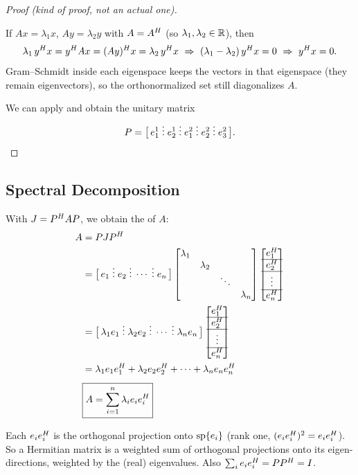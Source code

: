 \begin{proof}[Proof (kind of proof, not an actual one)]
\begin{insight}
If $Ax=\lambda_1x$, $Ay=\lambda_2y$ with $A=A^{H}$ (so $\lambda_1,\lambda_2\in\mathbb{R}$), then
\[
\lambda_1\, y^{H} x = y^{H} A x = (A y)^{H} x = \lambda_2\, y^{H} x
\ \Rightarrow\ (\lambda_1-\lambda_2)\,y^{H} x = 0
\ \Rightarrow\ y^{H} x = 0 .
\]
Gram--Schmidt inside each eigenspace keeps the vectors in that eigenspace (they remain eigenvectors), so the orthonormalized set still diagonalizes $A$.
\end{insight}
\point We can apply  and obtain the unitary matrix
\[
P = \bigl[\, e_1^1 \;\vdots\; e_2^1 \;\vdots\; e_1^2 \;\vdots\; e_2^2 \;\vdots\; e_3^2 \,\bigr].\qedhere
\]
\end{proof}

\subsection{Spectral Decomposition}\label{ss:spectral-decomp}
%
With $J = P^{H} A P$, we obtain the  of $A$:
\begingroup\renewcommand{\arraystretch}{1.25}%
\begin{align*}
A &= PJP^{H}\\
&= \bigl[\, e_1 \;\vdots\; e_2 \;\vdots\; \cdots \;\vdots\; e_n \,\bigr]
\begin{bmatrix}\lambda_1 & & & \\ & \lambda_2 & & \\ & & \ddots & \\ & & & \lambda_n\end{bmatrix}
\begin{bmatrix}e_1^{H}\\ \hline e_2^{H}\\ \hline \vdots\\ \hline e_n^{H}\end{bmatrix}\\
&= \bigl[\, \lambda_1 e_1 \;\vdots\; \lambda_2 e_2 \;\vdots\; \cdots \;\vdots\; \lambda_n e_n \,\bigr]
\begin{bmatrix}e_1^{H}\\ \hline e_2^{H}\\ \hline \vdots\\ \hline e_n^{H}\end{bmatrix}\\
&= \lambda_1 e_1 e_1^{H} + \lambda_2 e_2 e_2^{H} + \cdots + \lambda_n e_n e_n^{H}\\[4pt]
&\boxed{A = \sum_{i=1}^{n} \lambda_i e_i e_i^{H}}
\end{align*}\endgroup
\begin{insight}
Each $e_ie_i^{H}$ is the orthogonal projection onto $\operatorname{sp}\{e_i\}$ (rank one, $(e_ie_i^{H})^2=e_ie_i^{H}$). So a Hermitian matrix is a weighted sum of orthogonal projections onto its eigen-directions, weighted by the (real) eigenvalues. Also $\sum_i e_ie_i^{H} = PP^{H} = I$.
\end{insight}

